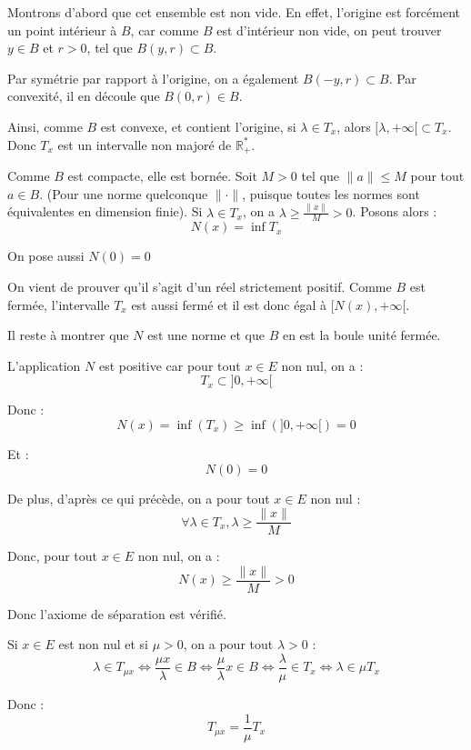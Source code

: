 Montrons d'abord que cet ensemble est non vide. En effet, l'origine est
forc{\'e}ment un point int{\'e}rieur {\`a} $B$, car comme $B$ est
d'int{\'e}rieur non vide, on peut trouver $y \in B$ et $r > 0$, tel que $B (y,
r) \subset B$.

Par sym{\'e}trie par rapport {\`a} l'origine, on a {\'e}galement $B (- y, r)
\subset B$. Par convexit{\'e}, il en d{\'e}coule que $B (0, r) \in B$.

Ainsi, comme $B$ est convexe, et contient l'origine, si $\lambda \in T_x$,
alors $[\lambda, + \infty [\subset T_x$. Donc $T_x$ est un intervalle non
major{\'e} de $\mathbb{R}^{\ast}_+$.

Comme $B$ est compacte, elle est born{\'e}e. Soit $M > 0$ tel que $\|a\| \leq
M$ pour tout $a \in B$. (Pour une norme quelconque $\| \cdot \|$, puisque
toutes les normes sont {\'e}quivalentes en dimension finie). Si $\lambda \in
T_x$, on a $\lambda \geq \frac{\|x\|}{M} > 0$. Posons alors :
\[ N (x) = \inf T_x \]


On pose aussi $N (0) = 0$

On vient de prouver qu'il s'agit d'un r{\'e}el strictement positif. Comme $B$
est ferm{\'e}e, l'intervalle $T_x$ est aussi ferm{\'e} et il est donc {\'e}gal
{\`a} $[N (x), + \infty [$.

Il reste {\`a} montrer que $N$ est une norme et que $B$ en est la boule
unit{\'e} ferm{\'e}e.

L'application $N$ est positive car pour tout $x \in E$ non nul, on a :
\[ T_x \subset] 0, + \infty [ \]


Donc :
\[ N (x) = \inf (T_x) \geq \inf (] 0, + \infty [) = 0 \]


Et :
\[ N (0) = 0 \]


De plus, d'apr{\`e}s ce qui pr{\'e}c{\`e}de, on a pour tout $x \in E$ non nul
:
\[ \forall \lambda \in T_x, \lambda \geq \frac{\|x\|}{M} \]


Donc, pour tout $x \in E$ non nul, on a :
\[ N (x) \geq \frac{\|x\|}{M} > 0 \]


Donc l'axiome de s{\'e}paration est v{\'e}rifi{\'e}.

Si $x \in E$ est non nul et si $\mu > 0$, on a pour tout $\lambda > 0$ :
\[ \lambda \in T_{\mu x} \Longleftrightarrow \frac{\mu x}{\lambda} \in B
   \Longleftrightarrow \frac{\mu}{\lambda} x \in B \Longleftrightarrow
   \frac{\lambda}{\mu} \in T_x \Longleftrightarrow \lambda \in \mu T_x \]


Donc :
\[ T_{\mu x} = \frac{1}{\mu} T_x \]



